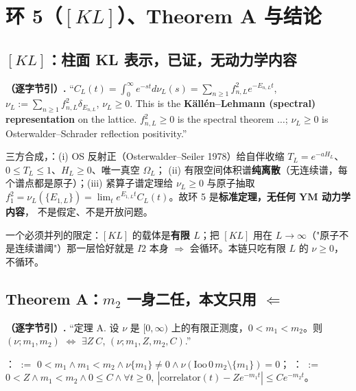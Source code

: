 \section{环 5（$[KL]$）、Theorem A 与结论}\label{sec:kl}

\subsection{$[KL]$：柱面 KL 表示，已证，无动力学内容}

\begin{quotebox}
\textbf{（逐字节引）.}
``$C_L(t)=\int_0^\infty e^{-st}d\nu_L(s)=\sum_{n\ge1}f_{n,L}^2e^{-E_{n,L}t}$,
$\nu_L:=\sum_{n\ge1}f_{n,L}^2\delta_{E_{n,L}}$, $\nu_L\ge0$.
This is the \textbf{Källén--Lehmann (spectral) representation} on the lattice.
$f_{n,L}^2\ge0$ is the spectral theorem $\dots$; $\nu_L\ge0$ is Osterwalder--Schrader reflection positivity.''
\end{quotebox}

三方合成，\LT：(i) OS 反射正（Osterwalder--Seiler 1978）给自伴收缩 $T_L=e^{-aH_L}$、$0\le T_L\le1$、$H_L\ge0$、唯一真空 $\Omega_L$；
(ii) 有限空间体积谱\textbf{纯离散}（无连续谱，每个谱点都是原子）；(iii) 紧算子谱定理给 $\nu_L\ge0$ 与原子抽取
$f_1^2=\nu_L(\{E_{1,L}\})=\lim_te^{E_{1,L}t}C_L(t)$。故环 5 是\textbf{标准定理，无任何 YM 动力学内容}，
不是假定、不是开放问题。\LT
{}

一个必须并列的限定：$[KL]$ 的载体是\textbf{有限 $L$}；把 $[KL]$ 用在 $L\to\infty$（"原子不是连续谱阈"）那一层恰好就是 $I2$
本身 $\Rightarrow$ 会循环。本链只吃有限 $L$ 的 $\nu\ge0$，不循环。\LT
{}

\subsection{Theorem A：$m_2$ 一身二任，本文只用 $\Leftarrow$}

\begin{quotebox}
\textbf{（逐字节引）.} ``定理 A. 设 $\nu$ 是 $[0,\infty)$ 上的有限正测度，$0<m_1<m_2$。则
$(\nu;m_1,m_2)$ $\Leftrightarrow$ $\exists Z\ C$, $(\nu;m_1,Z,m_2,C)$.''
\par\smallskip
{}： $:=$
$0<m_1\wedge m_1<m_2\wedge\nu\{m_1\}\ne0\wedge\nu(\mathrm{Ioo}\,0\,m_2\setminus\{m_1\})=0$；
： $:=$
$0<Z\wedge m_1<m_2\wedge0\le C\wedge\forall t\ge0,\ |\text{correlator}(t)-Ze^{-m_1t}|\le Ce^{-m_2t}$。
\end{quotebox}

